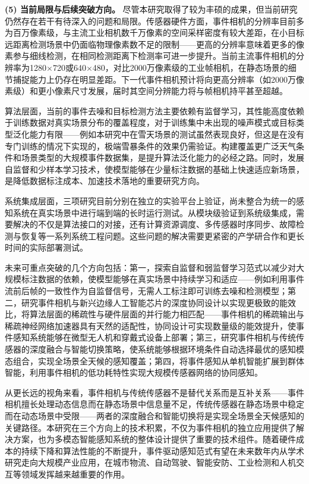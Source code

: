 \textbf{(5) 当前局限与后续突破方向。} 尽管本研究取得了较为丰硕的成果，但当前研究仍然存在若干有待深入的问题和局限。传感器硬件方面，事件相机的分辨率目前多为百万像素级，与主流工业相机数千万像素的空间采样密度有较大差距，在小目标远距离检测场景中仍面临物理像素数不足的限制——更高的分辨率意味着更多的像素参与细线检测，在相同检测距离下检测率可进一步提升。当前主流事件相机的分辨率为1280$\times$720或640$\times$480，对比2000万像素级的工业帧相机，在静态场景的细节捕捉能力上仍存在明显差距。下一代事件相机预计将向更高分辨率（如2000万像素级）和更小像素尺寸发展，届时其空间分辨能力将与帧相机持平甚至超越。

算法层面，当前的事件去噪和目标检测方法主要依赖有监督学习，其性能高度依赖于训练数据对真实场景分布的覆盖程度，对于训练集中未出现的噪声模式或目标类型泛化能力有限——例如本研究中在雪天场景的测试虽然表现良好，但这是在没有专门训练的情况下实现的，极端雪暴条件的效果仍需验证。构建覆盖更广泛天气条件和场景类型的大规模事件数据集，是提升算法泛化能力的必经之路。同时，发展自监督和少样本学习技术，使模型能够在少量标注数据的基础上快速适应新场景，是降低数据标注成本、加速技术落地的重要研究方向。

系统集成层面，三项研究目前分别在独立的实验平台上验证，尚未整合为统一的感知系统在真实场景中进行端到端的长时运行测试。从模块级验证到系统级集成，需要解决的不仅是算法接口的对接，还有计算资源调度、多传感器时序同步、故障检测与恢复等一系列系统工程问题。这些问题的解决需要更紧密的产学研合作和更长时间的实际部署测试。

未来可重点突破的几个方向包括：第一，探索自监督和弱监督学习范式以减少对大规模标注数据的依赖，使模型能够在真实场景中持续学习和适应——例如利用事件流前后帧的一致性作为自监督信号，无需人工标注即可训练去噪和检测模型；第二，研究事件相机与新兴边缘人工智能芯片的深度协同设计以实现更极致的能效比，将算法层面的稀疏性与硬件层面的并行能力相匹配——事件相机的稀疏输出与稀疏神经网络加速器具有天然的适配性，协同设计可实现数量级的能效提升，使事件感知系统能够在微型无人机和穿戴式设备上部署；第三，研究事件相机与传统传感器的深度融合与智能切换策略，使系统能够根据环境条件自动选择最优的感知模态组合，实现全场景全天候的感知覆盖；第四，将事件感知从单机智能扩展到群体智能，利用事件相机的低功耗特性实现大规模传感器网络的协同感知。

从更长远的视角来看，事件相机与传统传感器不是替代关系而是互补关系——事件相机擅长处理动态信息而在静态场景中信息量不足，传统传感器在静态场景中稳定而在动态场景中受限——两者的深度融合和智能切换将是实现全场景全天候感知的关键路径。本研究在三个方向上的技术积累，不仅为事件相机的独立应用提供了解决方案，也为多模态智能感知系统的整体设计提供了重要的技术组件。随着硬件成本的持续下降和算法性能的不断提升，事件驱动感知范式有望在未来数年内从学术研究走向大规模产业应用，在城市物流、自动驾驶、智能安防、工业检测和人机交互等领域发挥越来越重要的作用。
\clearpage